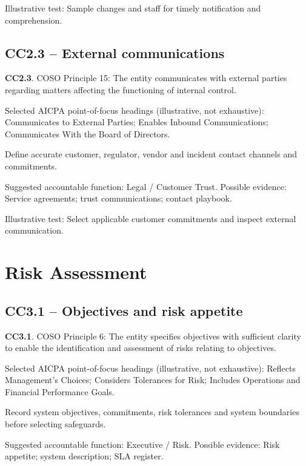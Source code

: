 \documentclass[10pt,oneside]{report}
\begin{document}
Illustrative test: Sample changes and staff for timely notification and comprehension.

\subsection*{CC2.3 -- External communications}
\begin{aicpabox}
\textbf{CC2.3}. COSO Principle 15: The entity communicates with external parties regarding matters affecting the functioning of internal control.\par{}
\end{aicpabox}
Selected AICPA point-of-focus headings (illustrative, not exhaustive): Communicates to External Parties; Enables Inbound Communications; Communicates With the Board of Directors.

\begin{engineeringbox}
Define accurate customer, regulator, vendor and incident contact channels and commitments.
\end{engineeringbox}
Suggested accountable function: Legal / Customer Trust. Possible evidence: Service agreements; trust communications; contact playbook.

Illustrative test: Select applicable customer commitments and inspect external communication.

\section{Risk Assessment}
\subsection*{CC3.1 -- Objectives and risk appetite}
\begin{aicpabox}
\textbf{CC3.1}. COSO Principle 6: The entity specifies objectives with sufficient clarity to enable the identification and assessment of risks relating to objectives.\par{}
\end{aicpabox}
Selected AICPA point-of-focus headings (illustrative, not exhaustive): Reflects Management's Choices; Considers Tolerances for Risk; Includes Operations and Financial Performance Goals.

\begin{engineeringbox}
Record system objectives, commitments, risk tolerances and system boundaries before selecting safeguards.
\end{engineeringbox}
Suggested accountable function: Executive / Risk. Possible evidence: Risk appetite; system description; SLA register.
\end{document}
